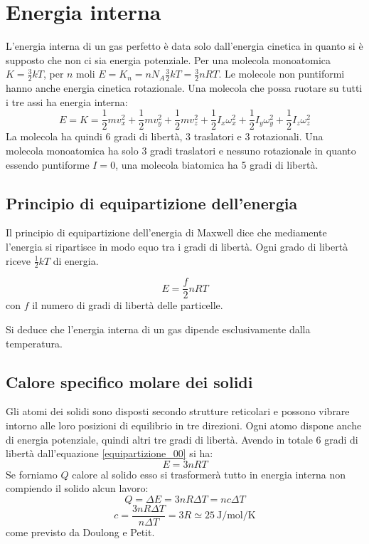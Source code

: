 \section{Energia interna}
L'energia interna di un gas perfetto è data solo dall'energia cinetica in quanto si è supposto che non ci sia energia potenziale. Per una molecola monoatomica $K=\frac{3}{2}kT$, per $n$ moli $E=K_n=nN_A\frac{3}{2}kT=\frac{3}{2}nRT$. Le molecole non puntiformi hanno anche energia cinetica rotazionale. Una molecola che possa ruotare su tutti i tre assi ha energia interna:
\[E=K=\frac{1}{2}mv_x^2+\frac{1}{2}mv_y^2+\frac{1}{2}mv_z^2+\frac{1}{2}I_x\omega_x^2+\frac{1}{2}I_y\omega_y^2+\frac{1}{2}I_z\omega_z^2\]
La molecola ha quindi 6 gradi di libertà, 3 traslatori e 3 rotazionali. Una molecola monoatomica ha solo 3 gradi traslatori e nessuno rotazionale in quanto essendo puntiforme $I=0$, una molecola biatomica ha 5 gradi di libertà.
\subsection{Principio di equipartizione dell'energia}
Il principio di equipartizione dell'energia di Maxwell dice che mediamente l'energia si ripartisce in modo equo tra i gradi di libertà. Ogni grado di libertà riceve $\frac{1}{2}kT$ di energia.
\begin{Pri}
\begin{equation}
E=\frac{f}{2}nRT
\label{equipartizione_00}
\end{equation}
con $f$ il numero di gradi di libertà delle particelle.
\end{Pri}
Si deduce che l'energia interna di un gas dipende esclusivamente dalla temperatura.
\subsection{Calore specifico molare dei solidi}
Gli atomi dei solidi sono disposti secondo strutture reticolari e possono vibrare intorno alle loro posizioni di equilibrio in tre direzioni. Ogni atomo dispone anche di energia potenziale, quindi altri tre gradi di libertà. Avendo in totale 6 gradi di libertà dall'equazione \eqref{equipartizione_00} si ha:
\[E=3nRT\]
Se forniamo $Q$ calore al solido esso si trasformerà tutto in energia interna non compiendo il solido alcun lavoro:
\[Q=\Delta E=3nR\Delta T=nc\Delta T\]
\[c=\frac{3nR\Delta T}{n\Delta T}=3R\simeq \SI{25}{\joule\per\mole\per\kelvin} \]
come previsto da Doulong e Petit.
